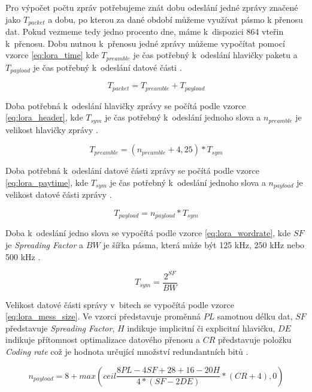 Pro výpočet počtu zpráv potřebujeme znát dobu odeslání jedné zprávy značené jako $T_{packet}$ a dobu, po kterou za dané období můžeme využívat pásmo k přenosu dat. Pokud vezmeme tedy jedno procento dne, máme k~dispozici 864 vteřin k~přenosu. Dobu nutnou k~přenosu jedné zprávy můžeme vypočítat pomocí vzorce \ref{eq:lora_time} kde $T_{preamble}$ je čas potřebný k~odeslání hlavičky paketu a $T_{payload}$ je čas potřebný k~odeslání datové části \cite{LORA_EQUATION}.

\begin{equation}
\label{eq:lora_time}
    T_{packet} = T_{preamble} + T_{payload}
\end{equation}

Doba potřebná k~odeslání hlavičky zprávy se počítá podle vzorce \ref{eq:lora_header}, kde $T_{sym}$ je čas potřebný k~odeslání jednoho slova a $n_{preamble}$ je velikost hlavičky zprávy \cite{LORA_EQUATION}.

\begin{equation}
\label{eq:lora_header}
    T_{preamble} = (n_{preamble}+4,25)*T_{sym}
\end{equation}

Doba potřebná k~odeslání datové části zprávy se počítá podle vzorce \ref{eq:lora_paytime}, kde $T_{sym}$ je čas potřebný k~odeslání jednoho slova a $n_{payload}$ je velikost datové části zprávy \cite{LORA_EQUATION}.

\begin{equation}
\label{eq:lora_paytime}
    T_{payload} = n_{payload}*T_{sym}
\end{equation}

Doba k~odeslání jedno slova se vypočítá podle vzorce \ref{eq:lora_wordrate}, kde $SF$ je \textit{Spreading Factor} a $BW$ je šířka pásma, která může být 125 kHz, 250 kHz nebo 500 kHz \cite{LORA_EQUATION}.

\begin{equation}
\label{eq:lora_wordrate}
    T_{sym} = \frac{2^{SF}}{BW}
\end{equation}

Velikost datové části správy v~bitech se vypočítá podle vzorce \ref{eq:lora_mess_size}. Ve vzorci představuje proměnná $PL$ samotnou délku dat, $SF$ představuje \textit{Spreading Factor}, $H$ indikuje implicitní či explicitní hlavičku, $DE$ indikuje přítomnost optimalizace datového přenosu a $CR$ představuje položku \textit{Coding rate} což je hodnota určující množství redundantních bitů \cite{LORA_EQUATION}.

\begin{equation}
\label{eq:lora_mess_size}
    n_{payload} = 8+max(ceil\frac{8PL-4SF+28+16-20H}{4*(SF-2DE)}*(CR+4), 0)
\end{equation}

